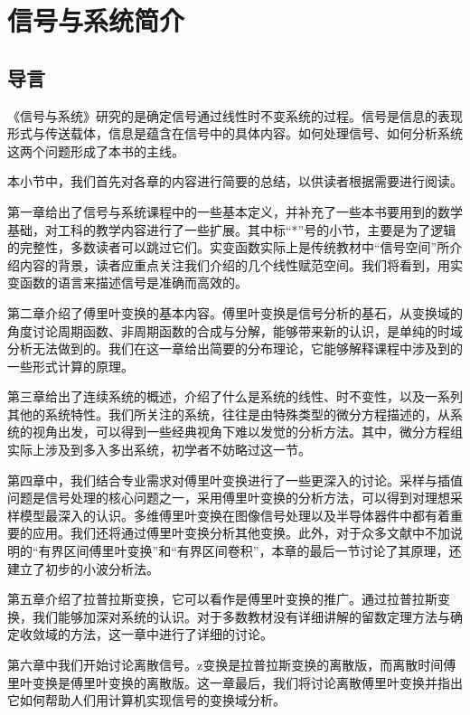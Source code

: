 \section{信号与系统简介}\label{sec:Introduction}

\subsection{导言}\label{sub:basic_concepts}

《信号与系统》研究的是确定信号通过线性时不变系统的过程。信号是信息的表现形式与传送载体，信息是蕴含在信号中的具体内容。如何处理信号、如何分析系统这两个问题形成了本书的主线。

本小节中，我们首先对各章的内容进行简要的总结，以供读者根据需要进行阅读。

第一章给出了信号与系统课程中的一些基本定义，并补充了一些本书要用到的数学基础，对工科的教学内容进行了一些扩展。其中标“*”号的小节，主要是为了逻辑的完整性，多数读者可以跳过它们。实变函数实际上是传统教材中“信号空间”所介绍内容的背景，读者应重点关注我们介绍的几个线性赋范空间。我们将看到，用实变函数的语言来描述信号是准确而高效的。

第二章介绍了傅里叶变换的基本内容。傅里叶变换是信号分析的基石，从变换域的角度讨论周期函数、非周期函数的合成与分解，能够带来新的认识，是单纯的时域分析无法做到的。我们在这一章给出简要的分布理论，它能够解释课程中涉及到的一些形式计算的原理。

第三章给出了连续系统的概述，介绍了什么是系统的线性、时不变性，以及一系列其他的系统特性。我们所关注的系统，往往是由特殊类型的微分方程描述的，从系统的视角出发，可以得到一些经典视角下难以发觉的分析方法。其中，微分方程组实际上涉及到多入多出系统，初学者不妨略过这一节。

第四章中，我们结合专业需求对傅里叶变换进行了一些更深入的讨论。采样与插值问题是信号处理的核心问题之一，采用傅里叶变换的分析方法，可以得到对理想采样模型最深入的认识。多维傅里叶变换在图像信号处理以及半导体器件中都有着重要的应用。我们还将通过傅里叶变换分析其他变换。此外，对于众多文献中不加说明的“有界区间傅里叶变换”和“有界区间卷积”，本章的最后一节讨论了其原理，还建立了初步的小波分析法。

第五章介绍了拉普拉斯变换，它可以看作是傅里叶变换的推广。通过拉普拉斯变换，我们能够加深对系统的认识。对于多数教材没有详细讲解的留数定理方法与确定收敛域的方法，这一章中进行了详细的讨论。

第六章中我们开始讨论离散信号。z变换是拉普拉斯变换的离散版，而离散时间傅里叶变换是傅里叶变换的离散版。这一章最后，我们将讨论离散傅里叶变换并指出它如何帮助人们用计算机实现信号的变换域分析。

